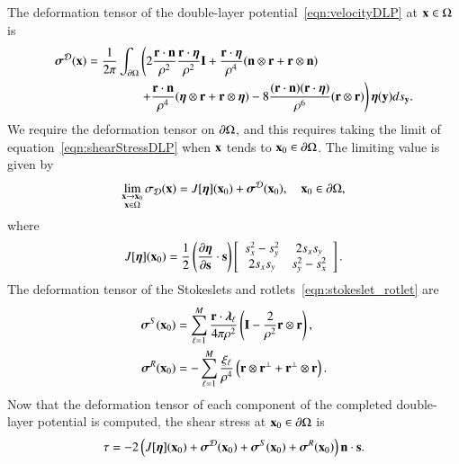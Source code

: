 \documentclass[preprint, 10pt]{elsarticle}
\begin{document}
The deformation tensor of the double-layer
potential~\eqref{eqn:velocityDLP} at ${\mathbf{x}} \in \Omega$
is~\cite{qua-bir2014a}
\begin{equation}
  \label{eqn:shearStressDLP}
  \begin{aligned}
  {\boldsymbol\sigma}^{\mathcal{D}}({\mathbf{x}}) = \frac{1}{2\pi}\int_{{\partial}\Omega} &\left(
    2\frac{{\mathbf{r}} \cdot {\mathbf{n}}}{\rho^2} \frac{{\mathbf{r}} \cdot {\boldsymbol\eta}}{\rho^2} {\mathbf{I}} + 
    \frac{{\mathbf{r}} \cdot {\boldsymbol\eta}}{\rho^4} ({\mathbf{n}} \otimes {\mathbf{r}} + {\mathbf{r}} \otimes {\mathbf{n}}) 
    \right. \\
    &\left.
    +\frac{{\mathbf{r}} \cdot {\mathbf{n}}}{\rho^4} ({\boldsymbol\eta} \otimes {\mathbf{r}} + {\mathbf{r}} \otimes {\boldsymbol\eta}) - 
    8\frac{({\mathbf{r}} \cdot {\mathbf{n}})({\mathbf{r}} \cdot {\boldsymbol\eta})}{\rho^6}({\mathbf{r}} \otimes {\mathbf{r}})
  \right) {\boldsymbol\eta}({\mathbf{y}}) ds_{\mathbf{y}}.
  \end{aligned}
\end{equation}
We require the deformation tensor on ${\partial}\Omega$, and this requires
taking the limit of equation~\eqref{eqn:shearStressDLP} when ${\mathbf{x}}$ tends
to ${\mathbf{x}}_0 \in {\partial}\Omega$.  The limiting value is given by
\begin{align*}
  \lim_{\substack{{\mathbf{x}} \rightarrow {\mathbf{x}}_0 \\ {\mathbf{x}} \in \Omega}}\sigma_{\mathcal{D}}({\mathbf{x}}) =
  J[{\boldsymbol\eta}]({\mathbf{x}}_0) + {\boldsymbol\sigma}^{\mathcal{D}}({\mathbf{x}}_0), \quad {\mathbf{x}}_0 \in {\partial}\Omega,
\end{align*} 
where
\begin{align}
  J[{\boldsymbol\eta}]({\mathbf{x}}_0) = \frac{1}{2}\left(\frac{\partial {\boldsymbol\eta}}{\partial {\mathbf{s}}} 
    \cdot {\mathbf{s}}\right) \left[ 
  \begin{array}{cc}
    s_x^2 - s_y^2 & 2s_x s_y \\ 2s_x s_y & s_y^2 - s_x^2
  \end{array}\right].
  \label{eqn:shearStressJump}
\end{align}
The deformation tensor of the Stokeslets and
rotlets~\eqref{eqn:stokeslet_rotlet} are
\begin{equation}
  \label{eqn:shearStressSR}
  \begin{aligned}
  {\boldsymbol\sigma}^S({\mathbf{x}}_0) &= \sum_{\ell=1}^{M}
    \frac{{\mathbf{r}} \cdot {\boldsymbol\lambda}_\ell}{4\pi\rho^2} \left(
    {\mathbf{I}} - \frac{2}{\rho^2} {\mathbf{r}} \otimes {\mathbf{r}} \right),  \\
  {\boldsymbol\sigma}^R({\mathbf{x}}_0) &= -\sum_{\ell=1}^M
    \frac{\xi_\ell}{\rho^4} \left({\mathbf{r}} \otimes {\mathbf{r}}^\perp + 
    {\mathbf{r}}^\perp \otimes {\mathbf{r}} \right).
  \end{aligned}
\end{equation}
Now that the deformation tensor of each component of the completed
double-layer potential is computed, the shear stress at ${\mathbf{x}}_0 \in
{\partial}\Omega$ is
\begin{align}
  \tau = -2 \left(J[{\boldsymbol\eta}]({\mathbf{x}}_0) + {\boldsymbol\sigma}^{\mathcal{D}}({\mathbf{x}}_0) + 
    {\boldsymbol\sigma}^S({\mathbf{x}}_0) + {\boldsymbol\sigma}^R({\mathbf{x}}_0)\right) {\mathbf{n}} \cdot {\mathbf{s}}.
  \label{eqn:shearStressLP}
\end{align}
\end{document}
